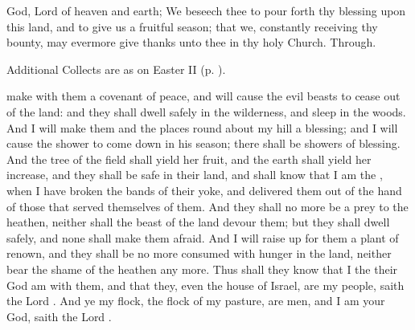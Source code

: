 \collect
{} God, Lord of heaven and earth; We beseech thee to pour forth thy blessing upon this land, and to give us a fruitful season; that we, constantly receiving thy bounty, may evermore give thanks unto thee in thy holy Church. Through.
\begin{rubric}
    Additional Collects are as on Easter II (p. \pageref{EasterIICollect}).
\end{rubric}
 make with them a covenant of peace, and will cause the evil beasts to cease out of the land: and they shall dwell safely in the wilderness, and sleep in the woods. And I will make them and the places round about my hill a blessing; and I will cause the shower to come down in his season; there shall be showers of blessing. And the tree of the field shall yield her fruit, and the earth shall yield her increase, and they shall be safe in their land, and shall know that I am the , when I have broken the bands of their yoke, and delivered them out of the hand of those that served themselves of them. And they shall no more be a prey to the heathen, neither shall the beast of the land devour them; but they shall dwell safely, and none shall make them afraid. And I will raise up for them a plant of renown, and they shall be no more consumed with hunger in the land, neither bear the shame of the heathen any more. Thus shall they know that I the  their God am with them, and that they, even the house of Israel, are my people, saith the Lord . And ye my flock, the flock of my pasture, are men, and I am your God, saith the Lord .


